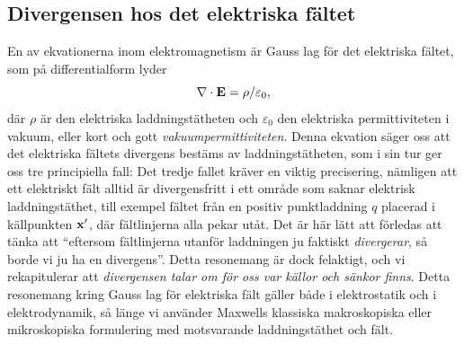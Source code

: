 \subsection{Divergensen hos det elektriska f{\"a}ltet}
En av ekvationerna inom elektromagnetism {\"a}r Gauss lag f{\"o}r det
elektriska f{\"a}ltet,
som p{\aa} differentialform lyder
$$
  \nabla\cdot{\bf E}=\rho/\varepsilon_0,
$$
d{\"a}r $\rho$ {\"a}r den elektriska laddningst{\"a}theten och $\varepsilon_0$
den elektriska permittiviteten i vakuum, eller kort och gott
{\it vakuumpermittiviteten}.
Denna ekvation s{\"a}ger oss att det elektriska f{\"a}ltets divergens
best{\"a}ms av laddningst{\"a}theten, som i sin tur ger oss tre principiella
fall:
\noindent
Det tredje fallet kr{\"a}ver en viktig precisering, n{\"a}mligen att ett
elektriskt f{\"a}lt alltid {\"a}r divergensfritt i ett omr{\aa}de som
saknar elektrisk laddningst{\"a}thet,
till exempel f{\"a}ltet fr{\aa}n en positiv punktladdning $q$ placerad
i k{\"a}llpunkten ${\bf x}'$, d{\"a}r f{\"a}ltlinjerna alla pekar ut{\aa}t.
\noindent
Det {\"a}r h{\"a}r l{\"a}tt att f{\"o}rledas att t{\"a}nka att ``eftersom
f{\"a}ltlinjerna utanf{\"o}r laddningen ju faktiskt {\it divergerar}, s{\aa}
borde vi ju ha en divergens''. Detta resonemang {\"a}r dock felaktigt, och vi
rekapitulerar att {\it divergensen talar om f{\"o}r oss var k{\"a}llor och
s{\"a}nkor finns}.
Detta resonemang kring Gauss lag f{\"o}r elektriska f{\"a}lt g{\"a}ller
b{\aa}de i elektrostatik och i elektrodynamik, s{\aa} l{\"a}nge vi
anv{\"a}nder Maxwells klassiska makroskopiska eller mikroskopiska formulering
med motsvarande laddningst{\"a}thet och f{\"a}lt.

